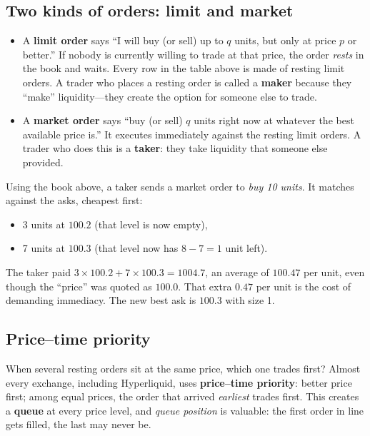 \documentclass[11pt]{article}
\begin{document}
\subsection{Two kinds of orders: limit and market}
\begin{itemize}
\item A \textbf{limit order} says ``I will buy (or sell) up to $q$ units, but only at price $p$ or better.'' If nobody is currently willing to trade at that price, the order \emph{rests} in the book and waits. Every row in the table above is made of resting limit orders. A trader who places a resting order is called a \textbf{maker} because they ``make'' liquidity---they create the option for someone else to trade.
\item A \textbf{market order} says ``buy (or sell) $q$ units right now at whatever the best available price is.'' It executes immediately against the resting limit orders. A trader who does this is a \textbf{taker}: they take liquidity that someone else provided.
\end{itemize}

\begin{example}
Using the book above, a taker sends a market order to \emph{buy 10 units}. It matches against the asks, cheapest first:
\begin{itemize}
\item 3 units at $100.2$ (that level is now empty),
\item 7 units at $100.3$ (that level now has $8-7=1$ unit left).
\end{itemize}
The taker paid $3\times100.2+7\times100.3=1004.7$, an average of $100.47$ per unit, even though the ``price'' was quoted as $100.0$. That extra $0.47$ per unit is the cost of demanding immediacy. The new best ask is $100.3$ with size 1.
\end{example}

\subsection{Price--time priority}
When several resting orders sit at the same price, which one trades first? Almost every exchange, including Hyperliquid, uses \textbf{price--time priority}: better price first; among equal prices, the order that arrived \emph{earliest} trades first. This creates a \textbf{queue} at every price level, and \emph{queue position} is valuable: the first order in line gets filled, the last may never be.
\end{document}

